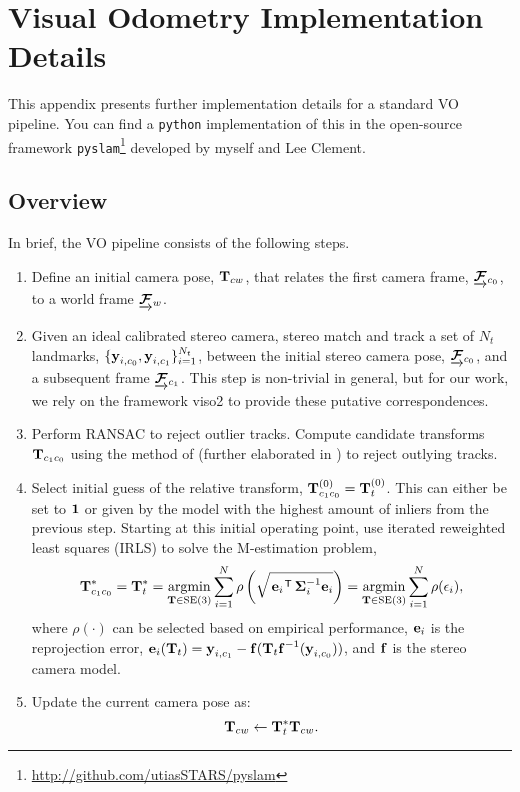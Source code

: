 \chapter{Visual Odometry Implementation Details}
\label{app:appendix_vo}

This appendix presents further implementation details for a standard VO pipeline. You can find a \texttt{python} implementation of this in the open-source framework \texttt{pyslam}\footnote{\url{http://github.com/utiasSTARS/pyslam}} developed by myself and Lee Clement. 

\section{Overview}
In brief, the VO pipeline consists of the following steps.
\begin{enumerate}
\item Define an initial camera pose, $\boldsymbol{\mathbf{T}}_{cw}$, that relates the first camera frame, $\underrightarrow{ \boldsymbol{\mathbf{\mathcal{F}}} }_{c_0}$, to a world frame $\underrightarrow{ \boldsymbol{\mathbf{\mathcal{F}}} }_{w}$.
\item Given an ideal calibrated stereo camera, stereo match and track a set of $N_t$ landmarks, $\{\boldsymbol{\mathbf{y}}_{i, c_0}, \boldsymbol{\mathbf{y}}_{i, c_1}\}_{i=1}^{N_t}$, between the initial stereo camera pose, $\underrightarrow{ \boldsymbol{\mathbf{\mathcal{F}}} }_{c_0}$, and a subsequent frame $\underrightarrow{ \boldsymbol{\mathbf{\mathcal{F}}} }_{c_1}$. This step is non-trivial in general, but for our work, we rely on the framework \textsf{viso2} to provide these putative correspondences.
\item Perform RANSAC to reject outlier tracks. Compute candidate transforms $\boldsymbol{\mathbf{T}}_{c_1c_0}$ using the method of \cite{Umeyama1991-ws} (further elaborated in \cite{Barfoot2017-ri}) to reject outlying tracks.
\item Select initial guess of the relative transform, $\boldsymbol{\mathbf{T}}_{c_1c_0}^{(0)} =  \boldsymbol{\mathbf{T}}_t^{(0)}$. This can either be set to $\boldsymbol{\mathbf{1}}$ or given by the model with the highest amount of inliers from the previous step. Starting at this initial operating point, use iterated reweighted least squares (IRLS) to solve the M-estimation problem,  
\begin{equation}
\label{eq:vo_app_robust_loss}
  \boldsymbol{\mathbf{T}}_{c_1c_0}^* = \boldsymbol{\mathbf{T}}_t^* = \operatorname*{argmin}_{\boldsymbol{\mathbf{T}}\in\text{SE}(3)}\sum_{i=1}^{N} 
  \rho\left(\sqrt{\left.{\boldsymbol{\mathbf{e}}_{i}}\right.^{\mkern-1.0mu\mathsf{T}} \boldsymbol{\mathbf{\Sigma}}_{i}^{-1} \boldsymbol{\mathbf{e}}_{i}}\right) = \operatorname*{argmin}_{\boldsymbol{\mathbf{T}}\in\text{SE}(3)}\sum_{i=1}^{N} 
  \rho(\epsilon_i),
\end{equation}
where $\rho(\cdot)$ can be selected based on empirical performance, $\boldsymbol{\mathbf{e}}_i$ is the reprojection error, $\boldsymbol{\mathbf{e}}_{i}(\boldsymbol{\mathbf{T}}_t)  = \boldsymbol{\mathbf{y}}_{i, c_1} - \boldsymbol{\mathbf{f}}( \boldsymbol{\mathbf{T}}_t 
    \boldsymbol{\mathbf{f}}^{-1}( \boldsymbol{\mathbf{y}}_{i, c_0} ) )$, and $\boldsymbol{\mathbf{f}}$ is the stereo camera model.
\item Update the current camera pose as:
\begin{equation}
	\boldsymbol{\mathbf{T}}_{cw} \leftarrow  \boldsymbol{\mathbf{T}}_t^* \boldsymbol{\mathbf{T}}_{cw}.
\end{equation}
\end{enumerate}


